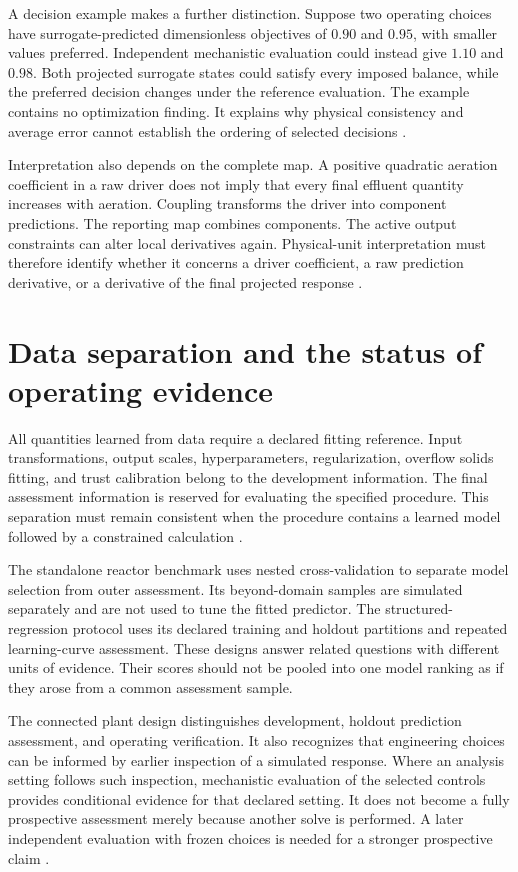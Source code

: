 A decision example makes a further distinction. Suppose two operating choices have surrogate-predicted dimensionless objectives of $0.90$ and $0.95$, with smaller values preferred. Independent mechanistic evaluation could instead give $1.10$ and $0.98$. Both projected surrogate states could satisfy every imposed balance, while the preferred decision changes under the reference evaluation. The example contains no optimization finding. It explains why physical consistency and average error cannot establish the ordering of selected decisions \citep{Alexandrov1998,Pedrozo2025}.

Interpretation also depends on the complete map. A positive quadratic aeration coefficient in a raw driver does not imply that every final effluent quantity increases with aeration. Coupling transforms the driver into component predictions. The reporting map combines components. The active output constraints can alter local derivatives again. Physical-unit interpretation must therefore identify whether it concerns a driver coefficient, a raw prediction derivative, or a derivative of the final projected response \citep{Brunton2016,Shen2023}.

\section{Data separation and the status of operating evidence}

All quantities learned from data require a declared fitting reference. Input transformations, output scales, hyperparameters, regularization, overflow solids fitting, and trust calibration belong to the development information. The final assessment information is reserved for evaluating the specified procedure. This separation must remain consistent when the procedure contains a learned model followed by a constrained calculation \citep{Kaufman2012}.

The standalone reactor benchmark uses nested cross-validation to separate model selection from outer assessment. Its beyond-domain samples are simulated separately and are not used to tune the fitted predictor. The structured-regression protocol uses its declared training and holdout partitions and repeated learning-curve assessment. These designs answer related questions with different units of evidence. Their scores should not be pooled into one model ranking as if they arose from a common assessment sample.

The connected plant design distinguishes development, holdout prediction assessment, and operating verification. It also recognizes that engineering choices can be informed by earlier inspection of a simulated response. Where an analysis setting follows such inspection, mechanistic evaluation of the selected controls provides conditional evidence for that declared setting. It does not become a fully prospective assessment merely because another solve is performed. A later independent evaluation with frozen choices is needed for a stronger prospective claim \citep{Kaufman2012,Zhang2026}.

